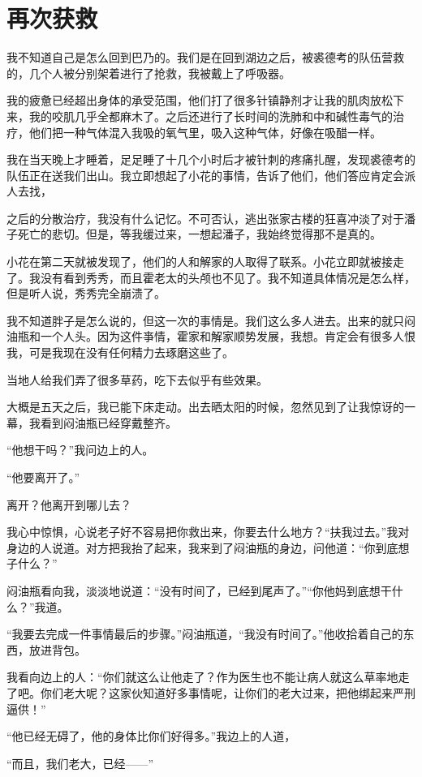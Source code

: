 \chapter{再次获救}

我不知道自己是怎么回到巴乃的。我们是在回到湖边之后，被裘德考的队伍营救的，几个人被分别架着进行了抢救，我被戴上了呼吸器。

我的疲惫已经超出身体的承受范围，他们打了很多针镇静剂才让我的肌肉放松下来，我的咬肌几乎全都麻木了。之后还进行了长时间的洗肺和中和碱性毒气的治疗，他们把一种气体混入我吸的氧气里，吸入这种气体，好像在吸醋一样。

我在当天晚上才睡着，足足睡了十几个小时后才被针刺的疼痛扎醒，发现裘德考的队伍正在送我们出山。我立即想起了小花的事情，告诉了他们，他们答应肯定会派人去找，

之后的分散治疗，我没有什么记忆。不可否认，逃出张家古楼的狂喜冲淡了对于潘子死亡的悲切。但是，等我缓过来，一想起潘子，我始终觉得那不是真的。

小花在第二天就被发现了，他们的人和解家的人取得了联系。小花立即就被接走了。我没有看到秀秀，而且霍老太的头颅也不见了。我不知道具体情况是怎么样，但是听人说，秀秀完全崩溃了。

我不知道胖子是怎么说的，但这一次的事情是。我们这么多人进去。出来的就只闷油瓶和一个人头。因为这件亊情，霍家和解家顺势发展，我想。肯定会有很多人恨我，可是我现在没有任何精力去琢磨这些了。

当地人给我们弄了很多草药，吃下去似乎有些效果。

大概是五天之后，我已能下床走动。出去晒太阳的时候，忽然见到了让我惊讶的一幕，我看到闷油瓶已经穿戴整齐。

“他想干吗？”我问边上的人。

“他要离开了。”

离开？他离开到哪儿去？

我心中惊惧，心说老子好不容易把你救出来，你要去什么地方？“扶我过去。”我对身边的人说道。对方把我抬了起来，我来到了闷油瓶的身边，问他道：“你到底想子什么？”

闷油瓶看向我，淡淡地说道：“没有时间了，已经到尾声了。”“你他妈到底想干什么？”我道。

“我要去完成一件事情最后的步骤。”闷油瓶道，“我没有时间了。”他收拾着自己的东西，放进背包。

我看向边上的人：“你们就这么让他走了？作为医生也不能让病人就这么草率地走了吧。你们老大呢？这家伙知道好多事情呢，让你们的老大过来，把他绑起来严刑逼供！”

“他已经无碍了，他的身体比你们好得多。”我边上的人道，

“而且，我们老大，已经——”

